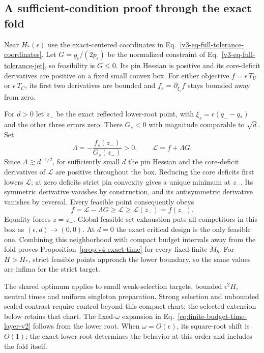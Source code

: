 \documentclass[aps,pre,reprint,amsmath,amssymb,longbibliography]{revtex4-2}
\begin{document}
\subsection{A sufficient-condition proof through the exact fold}
Near $H_*(\epsilon)$ use the exact-centered coordinates in
Eq.~\eqref{v3-eq-full-tolerance-coordinates}. Let
$G=g_\epsilon/(2p_\epsilon)$ be the normalized constraint of
Eq.~\eqref{v3-eq-full-tolerance-jet}, so feasibility is $G\le0$.
Its pin Hessian is positive and its core-deficit derivatives are
positive on a fixed small convex box. For either objective
$f=\epsilon\, T_U$ or $\epsilon \,T_C$, its first two derivatives are
bounded and $f_s=\partial_{\xi_s}f$ stays bounded away from zero.

For $d>0$ let $z_-$ be the exact reflected lower-root point, with
$\xi_s=\epsilon(q_--q_*)$ and the other three errors zero.
There $G_s<0$ with magnitude comparable to $\sqrt d$. Set
\begin{equation}
 \Lambda=-\frac{f_s(z_-)}{G_s(z_-)}>0,\qquad
 \mathcal L=f+\Lambda G.
 \label{eq:v4-fold-lagrangian}
\end{equation}
Since $\Lambda\gtrsim d^{-1/2}$, for sufficiently small $d$ the
pin Hessian and the core-deficit derivatives of $\mathcal L$ are
positive throughout the box. Reducing the core deficits first lowers
$\mathcal L$; at zero deficits strict pin convexity gives a unique
minimum at $z_-$. Its symmetric derivative vanishes by construction,
and its antisymmetric derivative vanishes by reversal. Every feasible
point consequently obeys
\begin{equation}
 f=\mathcal L-\Lambda G\ge\mathcal L
 \ge\mathcal L(z_-)=f(z_-).
 \label{eq:v4-fold-time-bound}
\end{equation}
Equality forces $z=z_-$. Global feasible-set exhaustion puts all
competitors in this box as $(\epsilon,d)\to(0,0)$.
At $d=0$ the exact critical design is the only feasible one. Combining
this neighborhood with compact budget intervals away from the fold
proves Proposition~\ref{prop:v4-exact-time} for every fixed finite
$M_b$. For $H>H_*$, strict feasible points approach the lower boundary,
so the same values are infima for the strict target.

The shared optimum applies to small weak-selection targets, bounded
$\epsilon^2H$, neutral times and uniform singleton preparation.
Strong selection and unbounded scaled contrast require control beyond
this compact chart; the selected extension below retains that chart. The
fixed-$\omega$ expansion in Eq.~\eqref{eq:finite-budget-time-layer-v2}
follows from the lower root. When $\omega=O(\epsilon)$, its square-root
shift is $O(1)$; the exact lower root determines the behavior at this
order and includes the fold itself.
\end{document}
